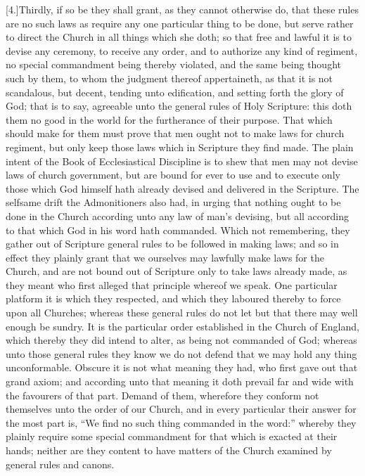 [4.]Thirdly, if so be they shall grant, as they cannot otherwise do, that these rules are no such laws as require any one particular thing to be done, but serve rather to direct the Church in all things which she doth; so that free and lawful it is to devise any ceremony, to receive any order, and to authorize any kind of regiment, no special commandment  being thereby violated, and the same being thought such by them, to whom the judgment thereof appertaineth, as that it is not scandalous, but decent, tending unto edification, and setting forth the glory of God; that is to say, agreeable unto the general rules of Holy Scripture: this doth them no good in the world for the furtherance of their purpose. That which should make for them must prove that men ought not to make laws for church regiment, but only keep those laws which in Scripture they find made. The plain intent of the Book of Ecclesiastical Discipline is to shew that men may not devise laws of church government, but are bound for ever to use and to execute only those which God himself hath already devised and delivered in the Scripture. The selfsame drift the Admonitioners also had, in urging that nothing ought to be done in the Church according unto any law of man’s devising, but all according to that which God in his word hath commanded. Which not remembering, they gather out of Scripture general rules to be followed in making laws; and so in effect they plainly grant that we ourselves may lawfully make laws for the Church, and are not bound out of Scripture only to take laws already made, as they meant who first alleged that principle whereof we speak. One particular platform it is which they respected, and which they laboured thereby to force upon all Churches; whereas these general rules do not let but that there may well enough be sundry. It is the particular order established in the Church of England, which thereby they did intend to alter, as being not commanded of God; whereas unto those general rules they know we do not defend that we may hold any thing unconformable. Obscure it is not what meaning they had, who first gave out that grand axiom; and according unto that meaning it doth prevail far and wide with the favourers of that part. Demand of them, wherefore they conform not themselves unto the order of our Church, and in every particular their answer for the most part is, “We find no such thing commanded in the word:” whereby they plainly require some special commandment for that which is exacted at their hands; neither are they content  to have matters of the Church examined by general rules and canons. 


